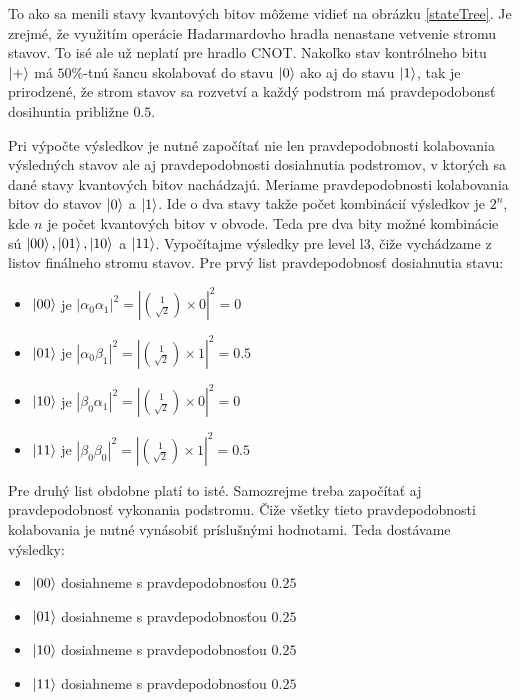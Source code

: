 To ako sa menili stavy kvantových bitov môžeme vidieť na obrázku
\ref{stateTree}. Je zrejmé, že využitím operácie Hadarmardovho hradla nenastane
vetvenie stromu stavov. To isé ale už neplatí pre hradlo CNOT. Nakoľko stav
kontrólneho bitu \(\ket{+}\) má \(50\%\)-tnú šancu skolabovať do stavu 
\(\ket{0}\) ako aj do stavu \(\ket{1}\), tak je prirodzené, že strom stavov 
sa rozvetví a každý podstrom má pravdepodobonsť dosihuntia približne \(0.5\).

Pri výpočte výsledkov je nutné započítať nie len pravdepodobnosti kolabovania
výsledných stavov ale aj pravdepodobnosti dosiahnutia podstromov, v ktorých 
sa dané stavy kvantových bitov nachádzajú. Meriame pravdepodobnosti kolabovania
bitov do stavov \(\ket{0}\) a \(\ket{1}\). Ide o dva stavy takže počet
kombinácií výsledkov je \(2^n\), kde \(n\) je počet kvantových bitov v obvode.
Teda pre dva bity možné kombinácie sú \(\ket{00}, \ket{01}, \ket{10}\) a
\(\ket{11}\). Vypočítajme výsledky pre level l3, čiže vychádzame z listov 
finálneho stromu stavov. Pre prvý list pravdepodobnosť dosiahnutia stavu:

\begin{itemize}
    \item \(\ket{00}\) je \(|\alpha_0\alpha_1|^2 = |\binom{1}{\sqrt{2}} \times
0|^2 = 0\)
    \item \(\ket{01}\) je \(|\alpha_0\beta_1|^2 = |\binom{1}{\sqrt{2}} \times
1|^2 = 0.5\)
    \item \(\ket{10}\) je \(|\beta_0\alpha_1|^2 = |\binom{1}{\sqrt{2}} \times
0|^2 = 0\)
    \item \(\ket{11}\) je \(|\beta_0\beta_0|^2 = |\binom{1}{\sqrt{2}} \times
1|^2 = 0.5\)
\end{itemize}

Pre druhý list obdobne platí to isté. Samozrejme treba započítať aj
pravdepodobnosť vykonania podstromu. Čiže všetky tieto pravdepodobnosti
kolabovania je nutné vynásobiť príslušnými hodnotami. Teda dostávame výsledky:
\begin{itemize}
    \item \(\ket{00}\) dosiahneme s pravdepodobnosťou \(0.25\)
    \item \(\ket{01}\) dosiahneme s pravdepodobnosťou \(0.25\)
    \item \(\ket{10}\) dosiahneme s pravdepodobnosťou \(0.25\)
    \item \(\ket{11}\) dosiahneme s pravdepodobnosťou \(0.25\)
\end{itemize}
